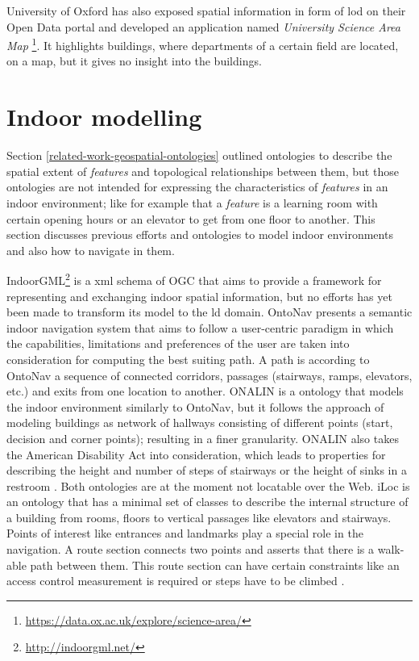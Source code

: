 \documentclass[draft,final]{vutinfth} %
\begin{document}
University of Oxford has also exposed spatial information in form of \gls{lod} on their Open Data portal and developed an application named \textit{University Science Area Map} \footnote{\url{https://data.ox.ac.uk/explore/science-area/}}. It highlights buildings, where departments of a certain field are located, on a map, but it gives no insight into the buildings.

\section{Indoor modelling}
\label{related-work-indoor-modelling}
Section \ref{related-work-geospatial-ontologies} outlined ontologies to describe the spatial extent of \textit{features} and topological relationships between them, but those ontologies are not intended for expressing the characteristics of \textit{features} in an indoor environment; like for example that a \textit{feature} is a learning room with certain opening hours or an elevator to get from one floor to another. This section discusses previous efforts and ontologies to model indoor environments and also how to navigate in them.

IndoorGML\footnote{\url{http://indoorgml.net/}} is a \gls{xml} schema of OGC that aims to provide a framework for representing and exchanging indoor spatial information, but no efforts has yet been made to transform its model to the \gls{ld} domain. OntoNav presents a semantic indoor navigation system that aims to follow a user-centric paradigm in which the capabilities, limitations and preferences of the user are taken into consideration for computing the best suiting path. A path is according to OntoNav a sequence of connected corridors, passages (stairways, ramps, elevators, etc.) and exits from one location to another\cite{anagnostopoulos_ontonav:_2005}. ONALIN is a ontology that models the indoor environment similarly to OntoNav, but it follows the approach of modeling buildings as network of hallways consisting of different points (start, decision and corner points); resulting in a finer granularity. ONALIN also takes the American Disability Act into consideration, which leads to properties for describing the height and number of steps of stairways or the height of sinks in a restroom \cite{dudas_onalin:_2009}. Both ontologies are at the moment not locatable over the Web. iLoc is an ontology that has a minimal set of classes to describe the internal structure of a building from rooms, floors to vertical passages like elevators and stairways. Points of interest like entrances and landmarks play a special role in the navigation. A route section connects two points and asserts that there is a walk-able path between them. This route section can have certain constraints like an access control measurement is required or steps have to be climbed \cite{szasz_ilocbuilding_2010}.
\end{document}
